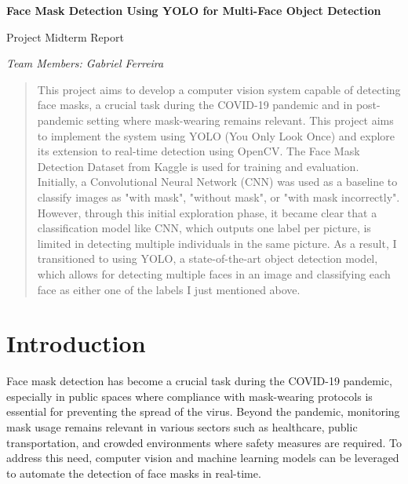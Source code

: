 \documentclass[11pt]{article}
\begin{document}
\begin{center}
{\Large \textbf{Face Mask Detection Using YOLO for Multi-Face Object Detection}

\vspace{10pt}

Project Midterm Report}

\vspace{10pt}

\textit{Team Members: Gabriel Ferreira}
\end{center}




\begin{abstract}
This project aims to develop a computer vision system capable of detecting face masks, a crucial task during the COVID-19 pandemic and in post-pandemic setting where mask-wearing remains relevant. This project aims to implement the system using YOLO (You Only Look Once) and explore its extension to real-time detection using OpenCV. The Face Mask Detection Dataset from Kaggle is used for training and evaluation. Initially, a Convolutional Neural Network (CNN) was used as a baseline to classify images as "with mask", "without mask", or "with mask incorrectly". However, through this initial exploration phase, it became clear that a classification model like CNN, which outputs one label per picture, is limited in detecting multiple individuals in the same picture. As a result, I transitioned to using YOLO, a state-of-the-art object detection model, which allows for detecting multiple faces in an image and classifying each face as either one of the labels I just mentioned above. 
\end{abstract}

\section{Introduction} 

Face mask detection has become a crucial task during the COVID-19 pandemic, especially in public spaces where compliance with mask-wearing protocols is essential for preventing the spread of the virus. Beyond the pandemic, monitoring mask usage remains relevant in various sectors such as healthcare, public transportation, and crowded environments where safety measures are required. To address this need, computer vision and machine learning models can be leveraged to automate the detection of face masks in real-time.
\end{document}
